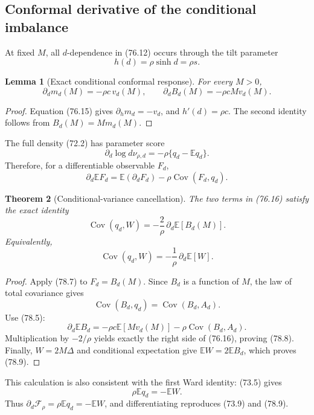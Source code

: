 \documentclass[11pt]{article}
\newtheorem{theorem}{Theorem}[section]
\newtheorem{lemma}[theorem]{Lemma}
\theoremstyle{remark}
\begin{document}
\subsection{Conformal derivative of the conditional imbalance}

At fixed \(M\), all \(d\)-dependence in (76.12) occurs through the
tilt parameter
\[
 h(d)=\rho\sinh d=\rho s.                         \tag{78.4}
\]

\begin{lemma}[Exact conditional conformal response]
\label{lem:v17v78-response}
For every \(M>0\),
\[
\boxed{
 \partial_dm_d(M)=-\rho c\,v_d(M),
 \qquad
 \partial_dB_d(M)=-\rho cM v_d(M).}               \tag{78.5}
\]
\end{lemma}

\begin{proof}
Equation (76.15) gives
\(\partial_hm_d=-v_d\), and \(h'(d)=\rho c\).
The second identity follows from \(B_d(M)=Mm_d(M)\).
\end{proof}

The full density (72.2) has parameter score
\[
 \partial_d\log d\nu_{\rho,d}
 =-\rho\{q_d-\mathbb Eq_d\}.                      \tag{78.6}
\]
Therefore, for a differentiable observable \(F_d\),
\[
 \partial_d\mathbb EF_d
 =\mathbb E(\partial_dF_d)-
 \rho\operatorname{Cov}(F_d,q_d).                \tag{78.7}
\]

\begin{theorem}[Conditional-variance cancellation]
\label{thm:v17v78-cancellation}
The two terms in (76.16) satisfy the exact identity
\[
\boxed{
 \operatorname{Cov}(q_d,W)
 =-\frac2\rho\,\partial_d\mathbb E[B_d(M)].}       \tag{78.8}
\]
Equivalently,
\[
\boxed{
 \operatorname{Cov}(q_d,W)
 =-\frac1\rho\,\partial_d\mathbb E[W].}           \tag{78.9}
\]
\end{theorem}

\begin{proof}
Apply (78.7) to \(F_d=B_d(M)\).  Since \(B_d\) is a function of
\(M\), the law of total covariance gives
\[
 \operatorname{Cov}(B_d,q_d)
 =\operatorname{Cov}(B_d,A_d).                   \tag{78.10}
\]
Use (78.5):
\[
 \partial_d\mathbb EB_d
 =-\rho c\mathbb E[Mv_d(M)]
 -\rho\operatorname{Cov}(B_d,A_d).               \tag{78.11}
\]
Multiplication by \(-2/\rho\) yields exactly the right side of
(76.16), proving (78.8).  Finally,
\(W=2M\Delta\) and conditional expectation give
\(\mathbb EW=2\mathbb EB_d\), which proves (78.9).
\end{proof}

This calculation is also consistent with the first Ward identity:
(73.5) gives
\[
 \rho\mathbb Eq_d=-\mathbb EW.                   \tag{78.12}
\]
Thus \(\partial_d\mathcal F_\rho=\rho\mathbb Eq_d=-\mathbb EW\),
and differentiating reproduces (73.9) and (78.9).
\end{document}
